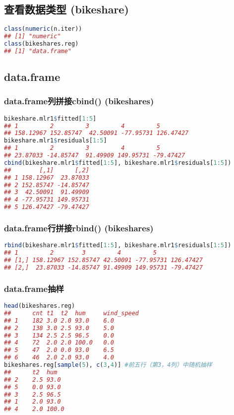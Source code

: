 \documentclass[11pt,a4paper]{article}
\begin{document}
\subsection{查看数据类型 (bikeshare)}
\begin{lstlisting}[language=R]
class(numeric(n.iter))
## [1] "numeric"
class(bikeshares.reg)
## [1] "data.frame"
\end{lstlisting}


\subsection{data.frame}
\subsubsection{data.frame列拼接cbind() (bikeshares)}
\begin{lstlisting}[language=R]
bikeshare.mlr1$fitted[1:5]
## 1         2         3         4         5 
## 158.12967 152.85747  42.50091 -77.95731 126.47427 
bikeshare.mlr1$residuals[1:5]
## 1         2         3         4         5 
## 23.87033 -14.85747  91.49909 149.95731 -79.47427 
cbind(bikeshare.mlr1$fitted[1:5], bikeshare.mlr1$residuals[1:5])
##        [,1]      [,2]
## 1 158.12967  23.87033
## 2 152.85747 -14.85747
## 3  42.50091  91.49909
## 4 -77.95731 149.95731
## 5 126.47427 -79.47427
\end{lstlisting}
\subsubsection{data.frame行拼接rbind() (bikeshares)}
\begin{lstlisting}[language=R]
rbind(bikeshare.mlr1$fitted[1:5], bikeshare.mlr1$residuals[1:5])
## 1         2        3         4         5
## [1,] 158.12967 152.85747 42.50091 -77.95731 126.47427
## [2,]  23.87033 -14.85747 91.49909 149.95731 -79.47427
\end{lstlisting}
\subsubsection{data.frame抽样}
\begin{lstlisting}[language=R]
head(bikeshares.reg)
##      cnt t1  t2  hum     wind_speed
## 1	182	3.0	2.0	93.0	6.0
## 2	138	3.0	2.5	93.0	5.0
## 3	134	2.5	2.5	96.5	0.0
## 4	72	2.0	2.0	100.0	0.0
## 5	47	2.0	0.0	93.0	6.5
## 6	46	2.0	2.0	93.0	4.0
bikeshares.reg[sample(5), c(3,4)] #前五行（第3，4列）中随机抽样
##      t2  hum
## 2	2.5	93.0
## 5	0.0	93.0
## 3	2.5	96.5
## 1	2.0	93.0
## 4	2.0	100.0
\end{lstlisting}
\end{document}
